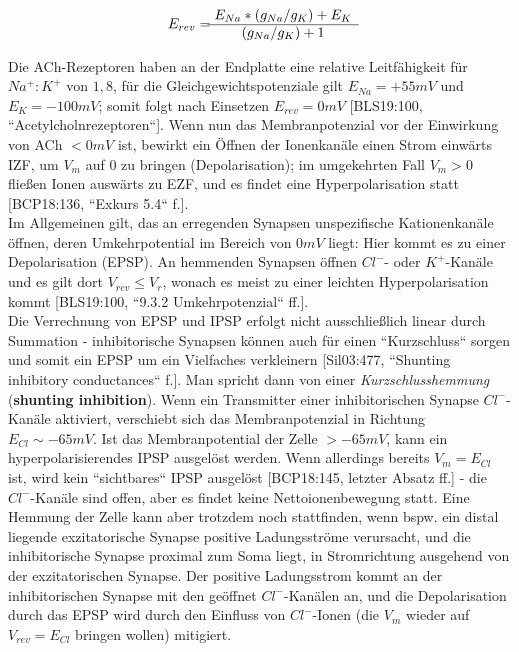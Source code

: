 {{\begin{equation}
E_{rev} = \begin{matrix}
            E_{Na} \space * \space (g_{Na} \space / \space g_{K}) \space + \space E_{K}  \\ \hline
            (g_{Na} \space / \space g_{K}) \space + 1
\end{matrix}
\end{equation}

Die ACh-Rezeptoren haben an der Endplatte eine relative Leitfähigkeit für $Na^+:K^+$ von $1,8$, für die Gleichgewichtspotenziale gilt $E_{Na} = +55 mV$ und $E_{K} = -100 mV$; somit folgt nach Einsetzen $E_{rev} = 0mV$ [BLS19:100, ``Acetylcholnrezeptoren``].
Wenn nun das Membranpotenzial vor der Einwirkung von ACh $< 0mV$ ist, bewirkt ein Öffnen der Ionenkanäle einen Strom einwärts IZF, um $V_m$ auf $0$ zu bringen (Depolarisation); im umgekehrten Fall $V_m > 0$ fließen Ionen auswärts zu EZF, und es findet eine Hyperpolarisation statt [BCP18:136, ``Exkurs 5.4`` f.].\\

Im Allgemeinen gilt, das an erregenden Synapsen unspezifische Kationenkanäle öffnen, deren Umkehrpotential im Bereich von $0mV$ liegt: Hier kommt es zu einer Depolarisation (EPSP). An hemmenden Synapsen öffnen $Cl^-$- oder $K^+$-Kanäle und es gilt dort $V_{rev} \leq V_r$, wonach es meist zu einer leichten Hyperpolarisation kommt [BLS19:100, ``9.3.2 Umkehrpotenzial`` ff.].\\

Die Verrechnung von EPSP und IPSP erfolgt nicht ausschließlich linear durch Summation - inhibitorische Synapsen können auch für einen ``Kurzschluss`` sorgen und somit ein EPSP um ein Vielfaches verkleinern [Sil03:477, ``Shunting inhibitory conductances`` f.]. Man spricht dann von einer \textit{Kurzschlusshemmung} (\textbf{shunting inhibition}). 
Wenn ein Transmitter einer inhibitorischen Synapse $Cl^-$-Kanäle aktiviert, verschiebt sich das Membranpotenzial in Richtung $E_{Cl} \sim -65 mV$. 
Ist das Membranpotential der Zelle $> -65 mV$, kann ein hyperpolarisierendes IPSP ausgelöst werden. 
Wenn allerdings bereits $V_m = E_{Cl}$ ist\footnotemark[65], wird kein ``sichtbares`` IPSP ausgelöst [BCP18:145, letzter Absatz ff.] - die $Cl^-$-Kanäle sind offen, aber es findet keine Nettoionenbewegung statt.
Eine Hemmung der Zelle kann aber trotzdem noch stattfinden, wenn bspw. ein distal liegende exzitatorische Synapse positive Ladungsströme verursacht, und die inhibitorische Synapse proximal zum Soma liegt, in Stromrichtung ausgehend von der exzitatorischen Synapse. 
Der positive Ladungsstrom kommt an der inhibitorischen Synapse mit den geöffnet $Cl^-$-Kanälen an, und die Depolarisation durch das EPSP wird durch den Einfluss von $Cl^-$-Ionen (die $V_m$ wieder auf $V_{rev} = E_{Cl}$ bringen wollen) mitigiert.

}}
